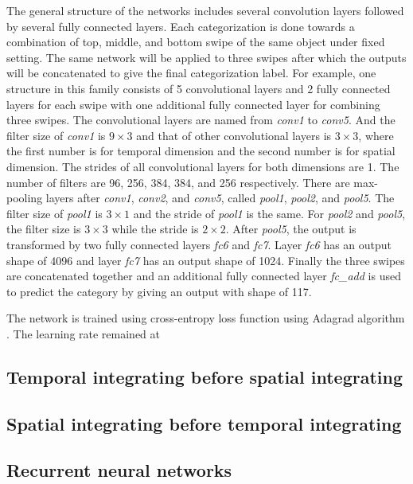The general structure of the networks includes several convolution layers followed by several fully connected layers. Each categorization is done towards a combination of top, middle, and bottom swipe of the same object under fixed setting. 
The same network will be applied to three swipes after which the outputs will be concatenated to give the final categorization label.
For example, one structure in this family consists of 5 convolutional layers and 2 fully connected layers for each swipe with one additional fully connected layer for combining three swipes. 
The convolutional layers are named from \textit{conv1} to \textit{conv5}.
And the filter size of \textit{conv1} is $9\times3$ and that of other convolutional layers is $3\times3$, where the first number is for temporal dimension and the second number is for spatial dimension. 
The strides of all convolutional layers for both dimensions are 1. The number of filters are 96, 256, 384, 384, and 256 respectively.
There are max-pooling layers after \textit{conv1}, \textit{conv2}, and \textit{conv5}, called \textit{pool1}, \textit{pool2}, and \textit{pool5}. The filter size of \textit{pool1} is $3\times1$ and the stride of \textit{pool1} is the same. 
For \textit{pool2} and \textit{pool5}, the filter size is $3\times3$ while the stride is $2\times2$.
After \textit{pool5}, the output is transformed by two fully connected layers \textit{fc6} and \textit{fc7}. Layer \textit{fc6} has an output shape of 4096 and layer \textit{fc7} has an output shape of 1024.
Finally the three swipes are concatenated together and an additional fully connected layer \textit{fc_add} is used to predict the category by giving an output with shape of 117.

The network is trained using cross-entropy loss function using Adagrad algorithm \cite{duchi2011adaptive}. 
The learning rate remained at 

\subsection{Temporal integrating before spatial integrating}

\subsection{Spatial integrating before temporal integrating}

\subsection{Recurrent neural networks}
